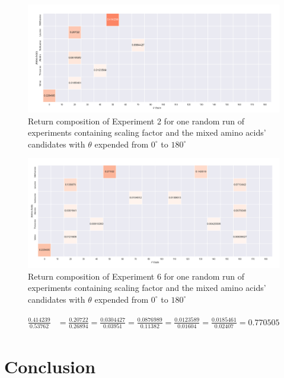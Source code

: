 \begin{figure}[!ht] 
\centering
\includegraphics[scale=0.5]{Figures/chapter6_figure_three.png}
\caption{Return composition of Experiment 2 for one random run of experiments containing scaling factor and the mixed amino acids' candidates with $\theta$ expended from $0^{\circ}$ to $180^{\circ}$} \label{fig:6.5}
\end{figure}

\begin{figure}[!ht] 
\centering
\includegraphics[scale=0.5]{Figures/chapter6_figure_four.png}
\caption{Return composition of Experiment 6 for one random run of experiments containing scaling factor and the mixed amino acids' candidates with $\theta$ expended from $0^{\circ}$ to $180^{\circ}$} \label{fig:6.6}
\end{figure}

\begin{eqnarray} 
\begin{split}
\frac{0.414239}{0.53762} &= \frac{0.20722}{0.26894} = \frac{0.0304427}{0.03951}  =\frac{0.0876989}{0.11382} = \frac{0.0123589}{0.01604} = \frac{0.0185461}{0.02407} = 0.770505
\end{split}\label{eqn:6.2}
\end{eqnarray}

\section{Conclusion}

